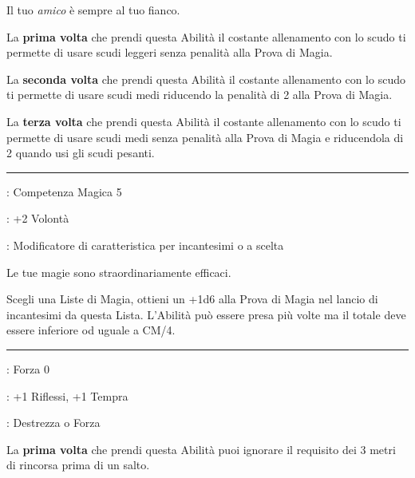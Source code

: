 \begin{multicols}{2}
Il tuo \emph{amico} è sempre al tuo fianco.

La \textbf{prima volta} che prendi questa Abilità il costante allenamento con lo scudo ti permette di usare scudi leggeri senza penalità alla Prova di Magia.

La \textbf{seconda volta} che prendi questa Abilità il costante allenamento con lo scudo ti permette di usare scudi medi riducendo la penalità di 2 alla Prova di Magia.

La \textbf{terza volta} che prendi questa Abilità il costante allenamento con lo scudo ti permette di usare scudi medi senza penalità alla Prova di Magia e riducendola di 2 quando usi gli scudi pesanti.

\smallskip\noindent\rule{\linewidth}{2pt} \hypertarget{Magie Potenti}{}\medskip{}
\noindent
\begin{description}[noitemsep, topsep=0pt, parsep=0pt, partopsep=0pt, leftmargin=0cm, labelwidth=2.5cm]
    \item[\textbf{Requisito}]: Competenza Magica 5
    \item[\textbf{Tiri Salvezza}]: +2 Volontà
    \item[\textbf{Caratteristica}]: Modificatore di caratteristica per incantesimi o a scelta
\end{description}

Le tue magie sono straordinariamente efficaci.

Scegli una Liste di Magia, ottieni un +1d6 alla Prova di Magia nel lancio di incantesimi da questa Lista. L'Abilità può essere presa più volte ma il totale deve essere inferiore od uguale a CM/4.

\smallskip\noindent\rule{\linewidth}{2pt} \hypertarget{Molla}{}\medskip{}
\noindent
\begin{description}[noitemsep, topsep=0pt, parsep=0pt, partopsep=0pt, leftmargin=0cm, labelwidth=2.5cm]
    \item[\textbf{Requisito}]: Forza 0
    \item[\textbf{Tiri Salvezza}]: +1 Riflessi, +1 Tempra
    \item[\textbf{Caratteristica}]: Destrezza o Forza
\end{description}

La \textbf{prima volta} che prendi questa Abilità puoi ignorare il requisito dei 3 metri di rincorsa prima di un salto.


\end{multicols}
